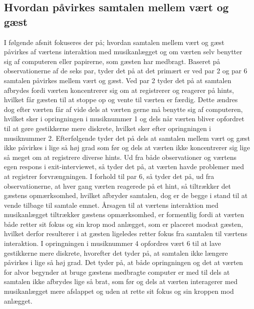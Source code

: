\subsection{Hvordan påvirkes samtalen mellem vært og gæst}
\label{TestresultaterSocialAcceptSamtale}
%
I følgende afsnit fokuseres der på; hvordan samtalen mellem vært og gæst påvirkes af værtens interaktion med musikanlægget og om værten selv benytter sig af computeren eller papirerne, som gæsten har medbragt. \blankline
%
Baseret på observationerne af de seks par, tyder det på at det primært er ved par 2 og par 6 samtalen påvirkes mellem vært og gæst. Ved par 2 tyder det på at samtalen afbrydes fordi værten koncentrerer sig om at registrerer og reagerer på hints, hvilket får gæsten til at stoppe op og vente til værten er færdig. Dette ændres dog efter værten får af vide dels at værten gerne må benytte sig af computeren, hvilket sker i opringningen i musiknummer 1 og dels når værten bliver opfordret til at gøre gestikkerne mere diskrete, hvilket sker efter opringningen i musiknummer 2. Efterfølgende tyder det på dels at samtalen mellem vært og gæst ikke påvirkes i lige så høj grad som før og dels at værten ikke koncentrerer sig lige så meget om at registrere diverse hints. Ud fra både observationer og værtens egen respons i exit-interviewet, så tyder det på, at værten havde problemer med at registrer forvrængningen. I forhold til par 6, så tyder det på, ud fra observationerne, at hver gang værten reagerede på et hint, så tiltrækker det gæstens opmærksomhed, hvilket afbryder samtalen, dog er de begge i stand til at vende tilbage til samtale emnet. Årsagen til at værtens interaktion med musikanlægget tiltrækker gæstens opmærksomhed, er formentlig fordi at værten både retter sit fokus og sin krop mod anlægget, som er placeret modsat gæsten, hvilket derfor resulterer i at gæsten ligeledes retter fokus fra samtalen til værtens interaktion. I opringningen i musiknummer 4 opfordres vært 6 til at lave gestikkerne mere diskrete, hvorefter det tyder på, at samtalen ikke længere påvirkes i lige så høj grad. Det tyder på, at både opringningen og det at værten for alvor begynder at bruge gæstens medbragte computer er med til dels at samtalen ikke afbrydes lige så brat, som før og dels at værten interagerer med musikanlægget mere afslappet og uden at rette sit fokus og sin kroppen mod anlægget.

